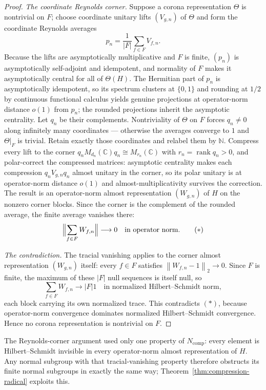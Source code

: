 \documentclass[11pt]{amsart}
\theoremstyle{definition}
\theoremstyle{remark}
\theoremstyle{plain}
\newcommand{\C}{\mathbb C}
\newcommand{\N}{\mathbb N}
\newcommand{\hsnorm}[1]{\left\lVert #1\right\rVert_{2}}
\begin{document}
\begin{proof}
\emph{The coordinate Reynolds corner.}  Suppose a corona
representation $\Theta$ is nontrivial on $F$; choose coordinate unitary
lifts $(V_{g,n})$ of $\Theta$ and form the coordinate Reynolds averages
\[
 p_n=\frac1{|F|}\sum_{f\in F}V_{f,n}.
\]
Because the lifts are asymptotically multiplicative and $F$ is finite,
$(p_n)$ is asymptotically self-adjoint and idempotent, and normality of
$F$ makes it asymptotically central for all of $\Theta(H)$.  The
Hermitian part of $p_n$ is asymptotically idempotent, so its spectrum
clusters at $\{0,1\}$ and rounding at $1/2$ by continuous functional
calculus yields genuine projections at operator-norm distance $o(1)$
from $p_n$; the rounded projections inherit the asymptotic centrality.
Let $q_n$ be their complements.  Nontriviality of
$\Theta$ on $F$ forces $q_n\ne0$ along infinitely many coordinates ---
otherwise the averages converge to $1$ and $\Theta|_F$ is trivial.
Retain exactly those coordinates and relabel them by $\N$.  Compress
every lift to the corner $q_nM_{d_n}(\C)q_n\cong M_{r_n}(\C)$ with
$r_n=\operatorname{rank}q_n>0$, and polar-correct the compressed
matrices: asymptotic centrality makes each compression
$q_nV_{g,n}q_n$ almost unitary in the corner, so its polar unitary is
at operator-norm distance $o(1)$ and almost-multiplicativity survives
the correction.  The result is an operator-norm almost representation
$(W_{g,n})$ of $H$ on the nonzero corner blocks.  Since the corner is
the complement of the rounded average, the finite average vanishes
there:
\[
 \Bigl\lVert\sum_{f\in F}W_{f,n}\Bigr\rVert\longrightarrow0
 \quad\text{in operator norm.}
 \tag{\ensuremath{\ast}}
\]

\emph{The contradiction.}  The tracial vanishing applies to the corner
almost representation $(W_{g,n})$ itself: every $f\in F$ satisfies
$\hsnorm{W_{f,n}-1}\to0$.  Since $F$ is finite, the maximum of these
$|F|$ null sequences is itself null, so
\[
 \sum_{f\in F}W_{f,n}\longrightarrow |F|1
 \quad\text{in normalized Hilbert--Schmidt norm},
\]
each block carrying its own normalized trace.  This contradicts
\((\ast)\), because operator-norm convergence dominates normalized
Hilbert--Schmidt convergence.  Hence no corona representation is
nontrivial on $F$.
\end{proof}

The Reynolds-corner argument used only one property of $N_{\mathrm{comp}}$: every
element is Hilbert--Schmidt invisible in every operator-norm almost
representation of $H$.  Any normal subgroup with that tracial-vanishing
property therefore obstructs its finite normal subgroups in exactly the
same way; Theorem~\ref{thm:compression-radical} exploits this.
\end{document}
